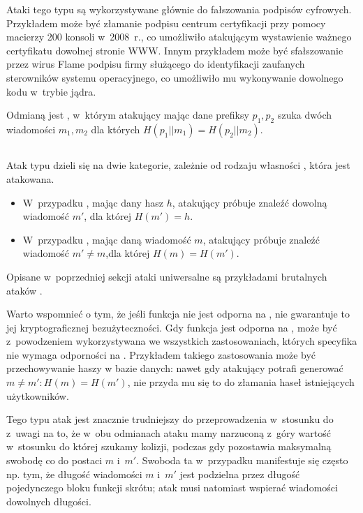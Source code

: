 Ataki tego typu są wykorzystywane głównie do fałszowania podpisów cyfrowych.
Przykładem może być złamanie podpisu centrum certyfikacji przy pomocy macierzy
200 konsoli  w~2008~r.\cite{ps3_attack}, co umożliwiło
atakującym wystawienie ważnego certyfikatu dowolnej stronie WWW. Innym
przykładem może być sfałszowanie przez wirus Flame podpisu firmy
 służącego do identyfikacji zaufanych sterowników systemu
operacyjnego\cite{flame_attack}, co umożliwiło mu wykonywanie dowolnego kodu
w~trybie jądra.

Odmianą  jest ,
w~którym atakujący mając dane prefiksy $p_1, p_2$ szuka dwóch wiadomości $m_1,
m_2$ dla których $H(p_1 || m_1) = H(p_2 || m_2)$.


\subsection{}
Atak typu  dzieli się na dwie kategorie, zależnie od rodzaju
własności , która jest atakowana.
    \begin{itemize}

    \item W~przypadku , mając dany hasz $h$, atakujący
    próbuje znaleźć dowolną wiadomość $m'$, dla której $H(m') = h$.

    \item W~przypadku , mając daną wiadomość $m$,
    atakujący próbuje znaleźć wiadomość $m' \neq m$,dla której $H(m) = H(m')$.

    \end{itemize}
Opisane w~poprzedniej sekcji ataki uniwersalne są przykładami
brutalnych ataków .

Warto wspomnieć o tym, że jeśli funkcja nie jest odporna na , nie gwarantuje to jej kryptograficznej bezużyteczności. Gdy funkcja
jest odporna na , może być z~powodzeniem wykorzystywana
we wszystkich zastosowaniach, których specyfika nie wymaga odporności na
. Przykładem takiego zastosowania może być przechowywanie
haszy w bazie danych: nawet gdy atakujący potrafi generować $m \neq m' : H(m) =
H(m')$, nie przyda mu się to do złamania haseł istniejących użytkowników.

Tego typu atak jest znacznie trudniejszy do przeprowadzenia w~stosunku do
 z~uwagi na to, że w~obu odmianach ataku mamy narzuconą
z~góry wartość w~stosunku do której szukamy kolizji, podczas gdy  pozostawia maksymalną swobodę co do postaci $m$ i~$m'$. Swoboda ta
w~przypadku  manifestuje się często np. tym, że długość
wiadomości $m$ i~$m'$ jest podzielna przez długość pojedynczego bloku funkcji
skrótu; atak  musi natomiast wspierać wiadomości dowolnych
długości.

